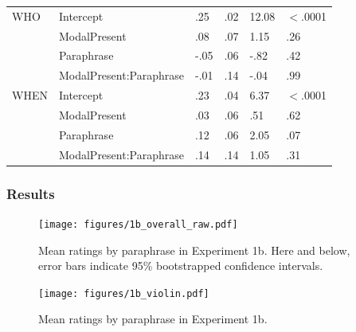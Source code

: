 \documentclass[12pt,letterpaper,table,svgnames,dvipsnames]{article}
\begin{document}
\begin{table}[p!]
\begin{center}
\begin{tabular}{llllll}
\midrule
WHO & Intercept & .25 & .02 & 12.08 & $<$.0001\\
{} & ModalPresent & .08 & .07 & 1.15 & .26\\
{} & Paraphrase & -.05 & .06 & -.82 & .42\\
{} & ModalPresent:Paraphrase & -.01 & .14 & -.04 & .99\\
\midrule
WHEN & Intercept & .23 & .04 & 6.37 & $<$.0001\\
{} & ModalPresent & .03 & .06 & .51 & .62\\
{} & Paraphrase & .12 & .06 & 2.05 & .07\\
{} & ModalPresent:Paraphrase & .14 & .14 & 1.05 & .31\\
\bottomrule
\end{tabular} 
\end{center} 
\end{table}

\subsubsection{Results}



\begin{figure}[h!]
\centering
\texttt{[image: figures/1b\_overall\_raw.pdf]}
\caption{Mean ratings by paraphrase in Experiment 1b. Here and below, error bars indicate 95\% bootstrapped confidence intervals.}
\label{ex1b_overall}
\end{figure}

\begin{figure}[h!]
\centering
\texttt{[image: figures/1b\_violin.pdf]}
\caption{Mean ratings by paraphrase in Experiment 1b.}
\label{ex1b_violin}
\end{figure}
\end{document}

